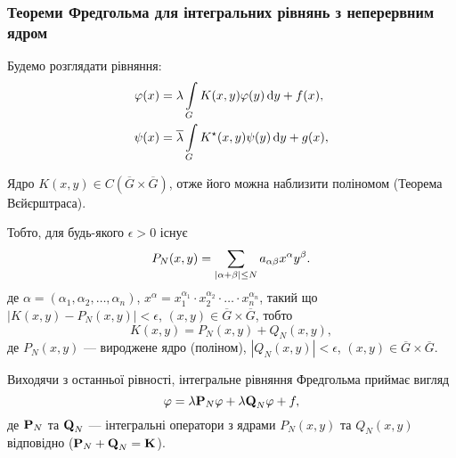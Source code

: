 % 


% 

% 


% 
% 


\subsubsection{Теореми Фредгольма для інтегральних рівнянь з неперервним ядром}

Будемо розглядати рівняння:
\begin{align}
	\phi(x) &= \lambda \Int_G K(x, y) \phi(y) \diff y + f(x), \\
	\psi(x) &= \overline \lambda \Int_G K^\star (x, y) \psi(y) \diff y + g(x),
\end{align}

Ядро $K(x, y) \in C\left(\overline G \times \overline G\right)$, отже його можна наблизити поліномом (Теорема Вєйєрштраса). \medskip

Тобто, для будь-якого $\epsilon > 0$ існує 
\begin{equation}
	P_N(x, y) = \Sum_{|\alpha + \beta| \le N} a_{\alpha\beta}x^\alpha y^\beta.
\end{equation}
де $\alpha = (\alpha_1, \alpha_2, \ldots, \alpha_n)$, $x^\alpha = x_1^{\alpha_1} \cdot x_2^{\alpha_2} \cdot \ldots \cdot x_n^{\alpha_n}$, такий що $|K(x, y) - P_N(x, y)| < \epsilon$, $(x, y) \in \overline G \times \overline G$, тобто 
\begin{equation}
	K(x, y) = P_N(x, y) + Q_N(x, y),
\end{equation}
де $P_N(x,y)$ --- вироджене ядро (поліном), $|Q_N(x, y)| < \epsilon$, $(x, y) \in \overline G \times \overline G$. \medskip

Виходячи з останньої рівності, інтегральне рівняння Фредгольма приймає вигляд 
\begin{equation}
	\phi = \lambda \bf{P}_N \phi + \lambda \bf{Q}_N \phi + f,
\end{equation}
де $\bf{P}_N$ та $\bf{Q}_N$ --- інтегральні оператори з ядрами $P_N(x, y)$ та $Q_N(x, y)$ відповідно ($\bf{P}_N + \bf{Q}_N = \bf{K}$). \medskip

